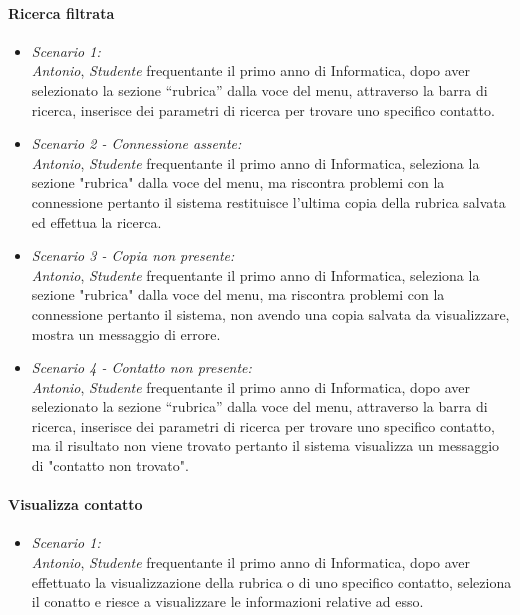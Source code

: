 \paragraph{Ricerca filtrata \\}
\begin{itemize}
	\item \textit{Scenario 1:\\}
	\textit{Antonio}, \textit{Studente} frequentante il primo anno di Informatica, dopo aver selezionato la sezione “rubrica” dalla voce del menu, attraverso la barra di ricerca, inserisce dei parametri di ricerca per trovare uno specifico contatto.\\
	
	\item \textit{Scenario 2 - Connessione assente:\\}
	\textit{Antonio}, \textit{Studente} frequentante il primo anno di Informatica, seleziona la sezione "rubrica" dalla voce del menu, ma riscontra problemi con la connessione pertanto il sistema restituisce l'ultima copia della rubrica salvata ed effettua la ricerca.\\
	
	\item \textit{Scenario 3 - Copia non presente:\\}
	\textit{Antonio}, \textit{Studente} frequentante il primo anno di Informatica, seleziona la sezione "rubrica" dalla voce del menu, ma riscontra problemi con la connessione pertanto il sistema, non avendo una copia salvata da visualizzare, mostra un messaggio di errore.\\
	
	\item \textit{Scenario 4 - Contatto non presente:\\}
	\textit{Antonio}, \textit{Studente} frequentante il primo anno di Informatica, dopo aver selezionato la sezione “rubrica” dalla voce del menu, attraverso la barra di ricerca, inserisce dei parametri di ricerca per trovare uno specifico contatto, ma il risultato non viene trovato pertanto il sistema visualizza un messaggio di "contatto non trovato".\\
\end{itemize}

\paragraph{Visualizza contatto \\}
\begin{itemize}
	\item \textit{Scenario 1:\\}
	\textit{Antonio}, \textit{Studente} frequentante il primo anno di Informatica, dopo aver effettuato la visualizzazione della rubrica o di uno specifico contatto, seleziona il conatto e riesce a visualizzare le informazioni relative ad esso.\\
\end{itemize}